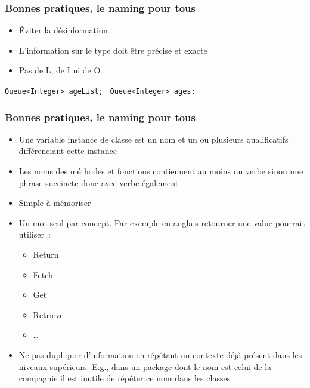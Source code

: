 \documentclass{beamer}
\begin{document}
    \begin{frame}
        \transdissolve
        \frametitle{Bonnes pratiques, le naming pour tous}

        \begin{itemize}

            \item Éviter la désinformation
            \item L'information sur le type doit être précise et exacte
            \item Pas de L, de I ni de O

        \end{itemize}
        \bigbreak

        \quad\texttt{Queue<Integer> ageList; }\quad{}
        \bigbreak
        \quad\texttt{Queue<Integer> ages; }\quad{}
    \end{frame}

    \begin{frame}
        \transdissolve
        \frametitle{Bonnes pratiques, le naming pour tous}

        \begin{itemize}

            \item Une variable instance de classe est un nom et un ou plusieurs qualificatifs différenciant cette instance
            \item Les noms des méthodes et fonctions contiennent au moins un verbe sinon une phrase succincte donc avec verbe également
            \item Simple à mémoriser
            \item Un mot seul par concept.
            Par exemple en anglais retourner une value pourrait utiliser~:
            \begin{itemize}
                \item Return
                \item Fetch
                \item Get
                \item Retrieve
                \item …
            \end{itemize}
            \item Ne pas dupliquer d'information en répétant un contexte déjà présent dans les niveaux supérieurs.
            E.g., dans un package dont le nom est celui de la compagnie il est inutile de répéter ce nom dans les classes

        \end{itemize}
    \end{frame}
\end{document}
